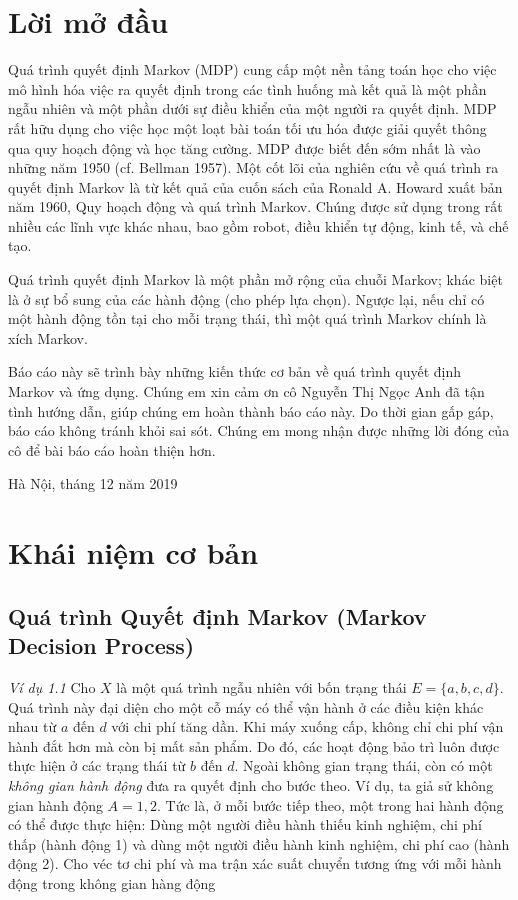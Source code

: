 \documentclass[12pt,a4paper]{report}
\begin{document}
	\large
	\chapter*{Lời mở đầu}
	\hspace{0.5cm}Quá trình quyết định Markov (MDP) cung cấp một nền tảng toán học cho việc mô hình hóa việc ra quyết định trong các tình huống mà kết quả là một phần ngẫu nhiên và một phần dưới sự điều khiển của một người ra quyết định. MDP rất hữu dụng cho việc học một loạt bài toán tối ưu hóa được giải quyết thông qua quy hoạch động và học tăng cường. MDP được biết đến sớm nhất là vào những năm 1950 (cf. Bellman 1957). Một cốt lõi của nghiên cứu về quá trình ra quyết định Markov là từ kết quả của cuốn sách của Ronald A. Howard xuất bản năm 1960, Quy hoạch động và quá trình Markov. Chúng được sử dụng trong rất nhiều các lĩnh vực khác nhau, bao gồm robot, điều khiển tự động, kinh tế, và chế tạo.
	
	Quá trình quyết định Markov là một phần mở rộng của chuỗi Markov; khác biệt là ở sự bổ sung của các hành động (cho phép lựa chọn). Ngược lại, nếu chỉ có một hành động tồn tại cho mỗi trạng thái, thì một quá trình Markov chính là xích Markov.
	
	Báo cáo này sẽ trình bày những kiến thức cơ bản về quá trình quyết định Markov và ứng dụng. Chúng em xin cảm ơn cô Nguyễn Thị Ngọc Anh đã tận tình hướng dẫn, giúp chúng em hoàn thành báo cáo này. Do thời gian gấp gáp, báo cáo không tránh khỏi sai sót. Chúng em mong nhận được những lời đóng của cô để bài báo cáo hoàn thiện hơn.
	
	\vfill
	\hfill Hà Nội, tháng 12 năm 2019
	
	\tableofcontents
	\chapter{Khái niệm cơ bản}
	 \section{Quá trình Quyết định Markov (Markov Decision Process)}


   
 	 \textit{Ví dụ 1.1} Cho $X$ là một quá trình ngẫu nhiên với bốn trạng thái $E=\{a,b,c,d\}$. Quá trình này đại diện cho một cỗ máy có thể vận hành ở các điều kiện khác nhau từ $a$ đến $d$ với chi phí tăng dần. Khi máy xuống cấp, không chỉ chi phí vận hành đắt hơn mà còn bị mất sản phẩm. Do đó, các hoạt động bảo trì luôn được thực hiện ở các trạng thái từ $b$ đến $d$. Ngoài không gian trạng thái, còn có một \textit{không gian hành động} đưa ra quyết định cho bước theo. Ví dụ, ta giả sử không gian hành động $A={1,2}$. Tức là, ở mỗi bước tiếp theo, một trong hai hành động có thể được thực hiện: Dùng một người điều hành thiếu kinh nghiệm, chi phí thấp (hành động 1) và dùng một người điều hành kinh nghiệm, chi phí cao (hành động 2). Cho véc tơ chi phí và ma trận xác suất chuyển tương ứng với mỗi hành động trong không gian hàng động
 	 
\end{document}

